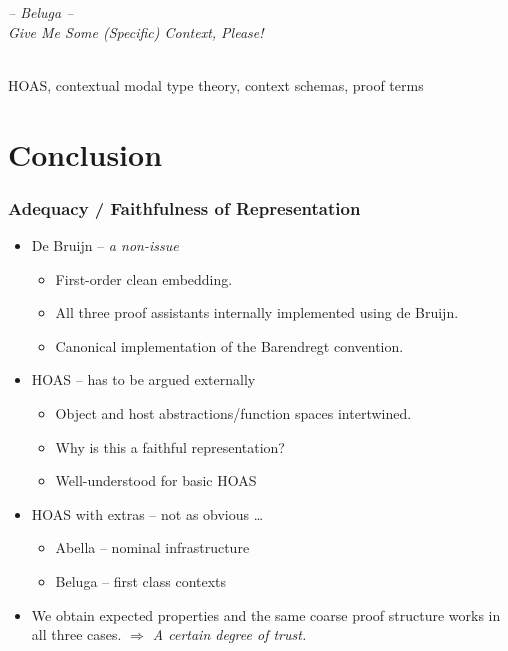 \documentclass[english,pdftex,dvipsnames,leqno,handout]{beamer}%
\newcommand{\hl}[1]{\emph{\color{sbmcyan} #1}}
\begin{document}
\begin{frame}
  \begin{center}
    \begin{Large}
      \hl{-- Beluga --\\[1em]Give Me Some (Specific) Context, Please!}
    \end{Large}\\[2em]
    HOAS, contextual modal type theory, context schemas, proof terms
  \end{center}
\end{frame}


\section*{Conclusion}

\begin{frame}
  \frametitle{Adequacy / Faithfulness of Representation}
  \begin{itemize}
  \item De Bruijn -- \hl{a non-issue}
    \begin{itemize}
    \item First-order clean embedding.
    \item All three proof assistants internally implemented using de Bruijn.
    \item Canonical implementation of the Barendregt convention.
    \end{itemize}
  \item HOAS -- has to be argued externally
    \begin{itemize}
    \item Object and host abstractions/function spaces intertwined.
    \item Why is this a faithful representation?
    \item Well-understood for basic HOAS
    \end{itemize}
  \item HOAS with extras -- not as obvious \ldots
    \begin{itemize}
    \item Abella -- nominal infrastructure
    \item Beluga -- first class contexts
    \end{itemize}
  \item We obtain expected properties and the same coarse proof structure works in all three cases. \hl{$\Rightarrow$ A certain degree of trust.}
  \end{itemize}
\end{frame}
\end{document}
